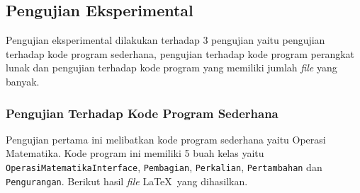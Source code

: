 \subsection{Pengujian Eksperimental}
\label{sec:pengujian eksperimental}
Pengujian eksperimental dilakukan terhadap 3 pengujian yaitu pengujian terhadap kode program sederhana, pengujian terhadap kode program perangkat lunak dan pengujian terhadap kode program yang memiliki jumlah {\it file} yang banyak.

\subsubsection{Pengujian Terhadap Kode Program Sederhana}
\label{sec:pengujian sederhana}
Pengujian pertama ini melibatkan kode program sederhana yaitu Operasi Matematika. Kode program ini memiliki 5 buah kelas yaitu \texttt{OperasiMatematikaInterface}, \texttt{Pembagian}, \texttt{Perkalian}, \texttt{Pertambahan} dan \texttt{Pengurangan}. Berikut hasil {\it file} \LaTeX\ yang dihasilkan.

